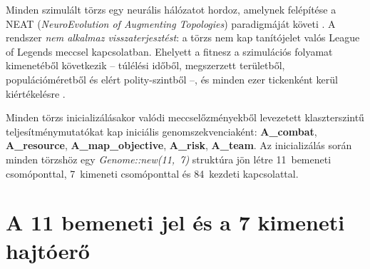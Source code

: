 Minden szimulált törzs egy neurális hálózatot hordoz, amelynek felépítése a NEAT (\textit{NeuroEvolution of Augmenting Topologies}) paradigmáját követi \cite{stanleymiikkulainen2002}. A rendszer \textit{nem alkalmaz visszaterjesztést}: a törzs nem kap tanítójelet valós League of Legends meccsel kapcsolatban. Ehelyett a fitnesz a szimulációs folyamat kimenetéből következik -- túlélési időből, megszerzett területből, populációméretből és elért polity-szintből --, és minden ezer tickenként kerül kiértékelésre \cite{holland1992}.

Minden törzs inicializálásakor valódi meccselőzményekből levezetett klaszterszintű teljesítménymutatókat kap iniciális genomszekvenciaként: \textbf{A\_combat}, \textbf{A\_resource}, \textbf{A\_map\_objective}, \textbf{A\_risk}, \textbf{A\_team}. Az inicializálás során minden törzshöz egy \textit{Genome::new(11,~7)} struktúra jön létre 11~bemeneti csomóponttal, 7~kimeneti csomóponttal és 84~kezdeti kapcsolattal.

\section{A 11 bemeneti jel és a 7 kimeneti hajtóerő}


